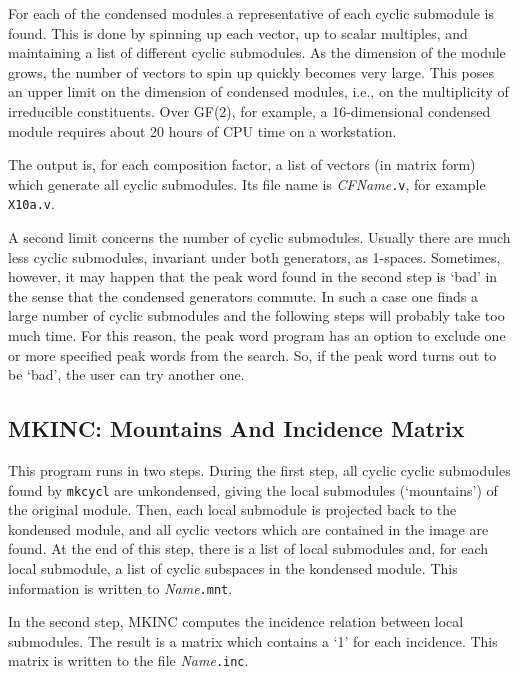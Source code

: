 \Description
For each of the condensed modules a representative of each cyclic
submodule is found. This is done by spinning up each vector, up to
scalar multiples, and maintaining a list of different cyclic
submodules. As the dimension of the module grows, the number
of vectors to spin up quickly becomes very large. This poses an upper
limit on the dimension of condensed modules, i.e., on the
multiplicity of irreducible constituents. Over GF(2), for example, a
16-dimensional condensed module requires about 20 hours of CPU time
on a workstation.

The output is, for each composition factor, a list of vectors (in
matrix form) which generate all cyclic submodules. Its file name
is {\it CFName}{\tt .v}, for example {\tt X10a.v}.

A second limit concerns the number of cyclic submodules. Usually there
are much less cyclic submodules, invariant under both generators, as
1-spaces. Sometimes, however, it may happen that the peak word found
in the second step is `bad' in the sense that the condensed generators
commute. In such a case one finds a large number of cyclic submodules
and the following steps will probably take too much time. For this
reason, the peak word program has an option to exclude one or more
specified peak words from the search. So, if the peak word turns out
to be `bad', the user can try another one.


\subsection{MKINC: Mountains And Incidence Matrix}
\Syntax
{}

\Description
This program runs in two steps. During the first step, all cyclic
cyclic submodules found by {\tt mkcycl} are unkondensed, giving the
local submodules (`mountains') of the original module. Then, each
local submodule is projected back to the kondensed module, and all
cyclic vectors which are contained in the image are found.
At the end of this step, there is a list of local submodules and,
for each local submodule, a list of cyclic subspaces in the
kondensed module. This information is written to {\it Name}{\tt .mnt}.

In the second step, MKINC computes the incidence relation between
local submodules. The result is a matrix which contains a `1' for
each incidence. This matrix is written to the file
{\it Name}{\tt.inc}.

